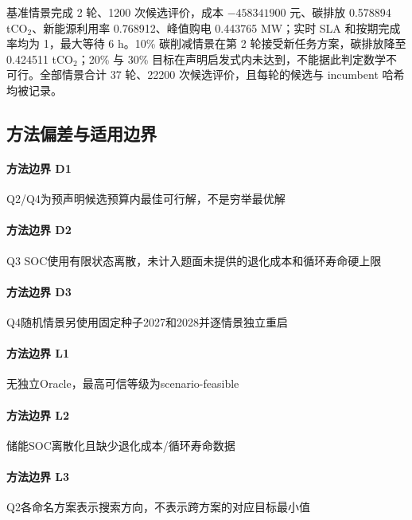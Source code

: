 基准情景完成 2 轮、1200 次候选评价，成本 $-458341900$ 元、碳排放 0.578894 tCO$_2$、新能源利用率 0.768912、峰值购电 0.443765 MW；实时 SLA 和按期完成率均为 1，最大等待 6 h。10\% 碳削减情景在第 2 轮接受新任务方案，碳排放降至 0.424511 tCO$_2$；20\% 与 30\% 目标在声明启发式内未达到，不能据此判定数学不可行。全部情景合计 37 轮、22200 次候选评价，且每轮的候选与 incumbent 哈希均被记录。



\subsection{方法偏差与适用边界}
\paragraph{方法边界 D1}Q2/Q4为预声明候选预算内最佳可行解，不是穷举最优解

\paragraph{方法边界 D2}Q3 SOC使用有限状态离散，未计入题面未提供的退化成本和循环寿命硬上限

\paragraph{方法边界 D3}Q4随机情景另使用固定种子2027和2028并逐情景独立重启

\paragraph{方法边界 L1}无独立Oracle，最高可信等级为scenario-feasible

\paragraph{方法边界 L2}储能SOC离散化且缺少退化成本/循环寿命数据

\paragraph{方法边界 L3}Q2各命名方案表示搜索方向，不表示跨方案的对应目标最小值
